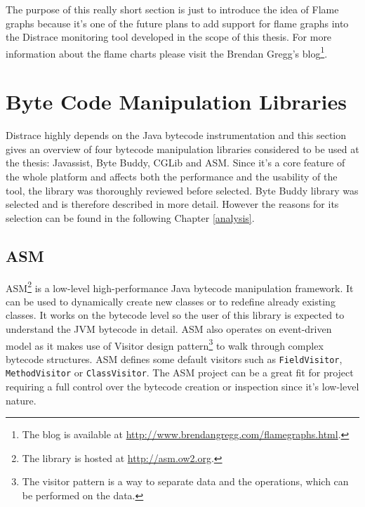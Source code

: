 The purpose of this really short section is just to introduce the idea of Flame graphs because it's one of the future plans to add support for flame graphs into the Distrace monitoring tool developed in the scope of this thesis. For more information about the flame charts please visit the Brendan Gregg's blog\footnote{The blog is available at \url{http://www.brendangregg.com/flamegraphs.html}.}.
\section{Byte Code Manipulation Libraries}
Distrace highly depends on the Java bytecode instrumentation and this section gives an overview of four bytecode manipulation libraries considered to be used at the thesis: Javassist, Byte Buddy, CGLib and ASM. Since it's a core feature of the whole platform and affects both the performance and the usability of the tool, the library was thoroughly reviewed before selected. Byte Buddy library was selected and is therefore described in more detail. However the reasons for its selection can be found in the following Chapter \ref{analysis}.

\subsection{ASM}
\label{asm}
ASM\footnote{The library is hosted at \url{http://asm.ow2.org}.} is a low-level high-performance Java bytecode manipulation framework. It can be used to dynamically create new classes or to redefine already existing classes. It works on the bytecode level so the user of this library is expected to understand the JVM bytecode in detail. ASM also operates on event-driven model as it makes use of Visitor design pattern\footnote{The visitor pattern is a way to separate data and the operations, which can be performed on the data.} to walk through complex bytecode structures. ASM defines some default visitors such as \texttt{FieldVisitor}, \texttt{MethodVisitor} or \texttt{ClassVisitor}. The ASM project can be a great fit for project requiring a full control over the bytecode creation or inspection since it's low-level nature.
